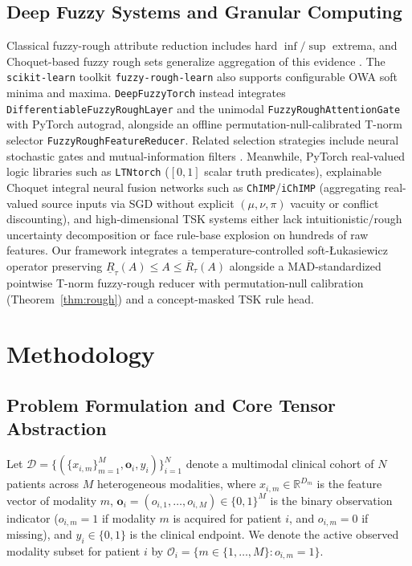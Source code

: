 \documentclass[10pt,twocolumn]{article}
\begin{document}
\subsection{Deep Fuzzy Systems and Granular Computing}
Classical fuzzy-rough attribute reduction
\cite{dubois1990rough,jensen2004fuzzy,cornelis2010attribute} includes hard $\inf/\sup$
extrema, and Choquet-based fuzzy rough sets generalize aggregation of this evidence
\cite{theerens2022choquet}. The \texttt{scikit-learn} toolkit \texttt{fuzzy-rough-learn}
\cite{lenz2022fuzzyroughlearn} also supports configurable OWA soft minima and maxima.
\texttt{DeepFuzzyTorch} instead integrates \texttt{DifferentiableFuzzyRoughLayer} and the
unimodal \texttt{FuzzyRoughAttentionGate} with PyTorch autograd, alongside an offline
permutation-null-calibrated T-norm selector \texttt{FuzzyRoughFeatureReducer}. Related
selection strategies include neural stochastic gates \cite{yamada2020feature} and
mutual-information filters \cite{peng2005feature}. Meanwhile, PyTorch real-valued logic
libraries such as
\texttt{LTNtorch} \cite{badreddine2022ltntorch} ($[0,1]$ scalar truth predicates), explainable
Choquet integral neural fusion networks such as \texttt{ChIMP}/\texttt{iChIMP}
\cite{islam2020chimp} (aggregating real-valued source inputs via SGD without explicit
$(\mu,\nu,\pi)$ vacuity or conflict discounting), and high-dimensional TSK systems
\cite{jang1993anfis,wu2020optimize,cui2021curse} either lack intuitionistic/rough uncertainty
decomposition or face rule-base explosion on hundreds of raw features. Our framework integrates
a temperature-controlled soft-{\L}ukasiewicz operator preserving $\underline{R}_\tau(A) \le A
\le \overline{R}_\tau(A)$ alongside a MAD-standardized pointwise T-norm fuzzy-rough reducer
with permutation-null calibration (Theorem~\ref{thm:rough}) and a concept-masked TSK rule head.

\section{Methodology}
\label{sec:method}

\subsection{Problem Formulation and Core Tensor Abstraction}
\label{sec:design_principles}

Let $\mathcal{D} = \{(\{x_{i,m}\}_{m=1}^M, \bm{o}_i, y_i)\}_{i=1}^N$ denote a multimodal
clinical cohort of $N$ patients across $M$ heterogeneous modalities, where $x_{i,m} \in
\mathbb{R}^{D_m}$ is the feature vector of modality $m$, $\bm{o}_i = (o_{i,1},\dots,o_{i,M})
\in \{0,1\}^M$ is the binary observation indicator ($o_{i,m}=1$ if modality $m$ is acquired for
patient $i$, and $o_{i,m}=0$ if missing), and $y_i \in \{0,1\}$ is the clinical endpoint. We
denote the active observed modality subset for patient $i$ by $\mathcal{O}_i = \{m \in
\{1,\dots,M\} : o_{i,m}=1\}$.
\end{document}
